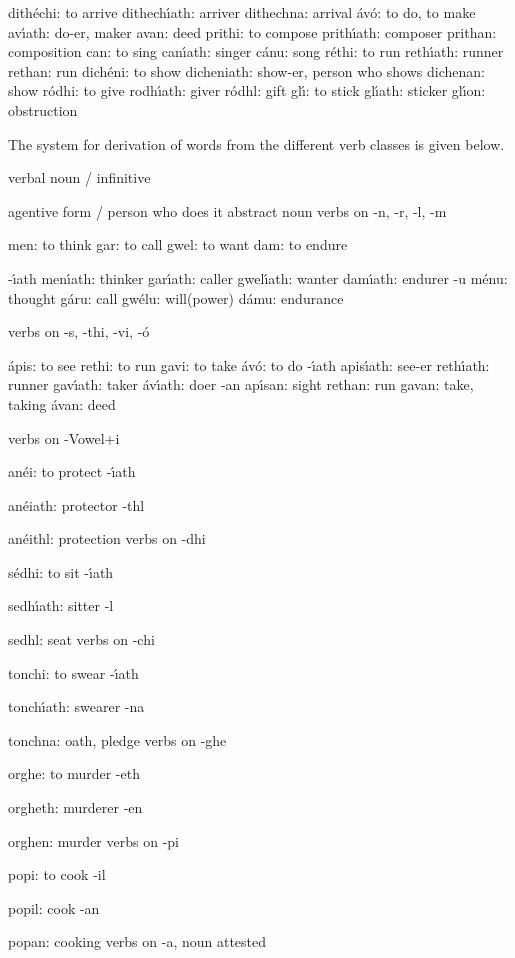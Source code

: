 dith\'{e}chi: to arrive
dithech\'{\i}ath: arriver
dithechna: arrival
\'{a}v\'{o}: to do, to make
av\'{\i}ath: do-er, maker
avan: deed
prithi: to compose
prith\'{\i}ath: composer
prithan: composition
can: to sing
can\'{\i}ath: singer
c\'{a}nu: song
r\'{e}thi: to run
reth\'{\i}ath: runner
rethan: run
dich\'{e}ni: to show
dicheniath: show-er, person who shows
dichenan: show
r\'{o}dhi: to give
rodh\'{\i}ath: giver
r\'{o}dhl: gift
gl\'{\i}: to stick
gl\'{\i}ath: sticker
gl\'{\i}on: obstruction

The system for derivation of words from the different verb classes is given below.
 
verbal noun / infinitive
 
	agentive form / person who does it 	abstract noun
verbs on -n, -r, -l, -m

men: to think
gar: to call
gwel: to want
dam: to endure

	-\'{\i}ath
men\'{\i}ath: thinker
gar\'{\i}ath: caller
gwel\'{\i}ath: wanter
dam\'{\i}ath: endurer
	-u
m\'{e}nu: thought
g\'{a}ru: call
gw\'{e}lu: will(power)
d\'{a}mu: endurance

verbs on -s, -thi, -vi, -\'{o}

\'{a}pis: to see
rethi: to run
gavi: to take
\'{a}v\'{o}: to do
	-\'{\i}ath
apis\'{\i}ath: see-er
reth\'{\i}ath: runner
gav\'{\i}ath: taker
\'{a}v\'{\i}ath: doer
	-an
ap\'{\i}san: sight
rethan: run
gavan: take, taking
\'{a}van: deed

verbs on -Vowel+i

an\'{e}i: to protect
	-\'{\i}ath

an\'{e}iath: protector
	-thl

an\'{e}ithl: protection
verbs on -dhi

s\'{e}dhi: to sit
	-\'{\i}ath

sedh\'{\i}ath: sitter
	-l

sedhl: seat
verbs on -chi

tonchi: to swear
	-\'{\i}ath

tonch\'{\i}ath: swearer
	-na

tonchna: oath, pledge
verbs on -ghe

orghe: to murder
	-eth

orgheth: murderer
	-en

orghen: murder
verbs on -pi

popi: to cook
	-il

popil: cook
	-an

popan: cooking
verbs on -a, noun attested


